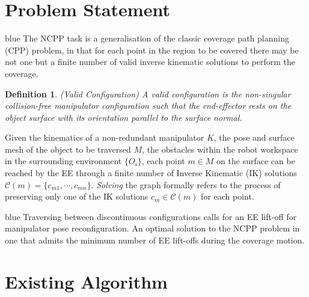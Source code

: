 \documentclass[journal]{IEEEtran}
\newtheorem{definition}[theorem]{Definition}
\begin{document}
\section{Problem Statement}\label{section_problem_statement}
\begin{color}{blue}
The NCPP task is a generalisation of the classic coverage path planning (CPP) problem, in that for each point in the region to be covered there may be not one but a finite number of valid inverse kinematic solutions to perform the coverage. 
\end{color}
\begin{definition}
(Valid Configuration) A valid configuration is the non-singular~\cite{Yoshikawa1990Translational} collision-free manipulator configuration such that the end-effector rests on the object surface with its orientation parallel to the surface normal. 
\end{definition}
Given the kinematics of a non-redundant manipulator $K$, the pose and surface mesh of the object to be traversed $M$, the obstacles within the robot workspace in the surrounding environment $\{O_i\}$, each point $m\in M$ on the surface can be reached by the EE through a finite number of Inverse Kinematic (IK) solutions $\mathscr{C}(m) = \{c_{m1}, \cdots, c_{mn}\}$. 
\textit{Solving} the graph formally refers to the process of preserving only one of the IK solutions $c_m\in \mathscr{C}(m)$ for each point. 
\begin{color}{blue}
Traversing between discontinuous configurations calls for an EE lift-off for manipulator pose reconfiguration. 
An optimal solution to the NCPP problem in one that admits the minimum number of EE lift-offs during the coverage motion. 
\end{color}

\section{Existing Algorithm}\label{section_existing_algorithm}
\end{document}
